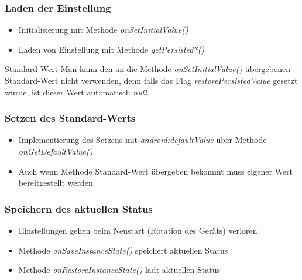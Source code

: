 \begin{frame}
   \frametitle{Laden der Einstellung}
   \begin{itemize}
      \item Initialisierung mit Methode \emph{onSetInitialValue()}
      \item Laden von Einstellung mit Methode \emph{getPersisted*()} 
   \end{itemize}

   

   \begin{alertblock}{Standard-Wert}
      Man kann den an die Methode \emph{onSetInitialValue()} übergebenen Standard-Wert 
      nicht verwenden, denn falls das Flag \emph{restorePersistedValue} gesetzt wurde, 
      ist dieser Wert automatisch \emph{null}.
   \end{alertblock}
\end{frame}

\begin{frame}
   \frametitle{Setzen des Standard-Werts}
   \begin{itemize}
      \item Implementierung des Setzens mit \emph{android:defaultValue} 
         über Methode \emph{onGetDefaultValue()}
      \item Auch wenn Methode Standard-Wert übergeben bekommt muss 
         eigener Wert bereitgestellt werden
   \end{itemize}

   
\end{frame}

\begin{frame}
   \frametitle{Speichern des aktuellen Status}
   \begin{itemize}
      \item Einstellungen gehen beim Neustart (Rotation des Geräts) 
         verloren
      \item Methode \emph{onSaveInstanceState()} speichert aktuellen 
         Status
      \item Methode \emph{onRestoreInstanceState()} lädt aktuellen 
         Status
   \end{itemize}

   
\end{frame}


